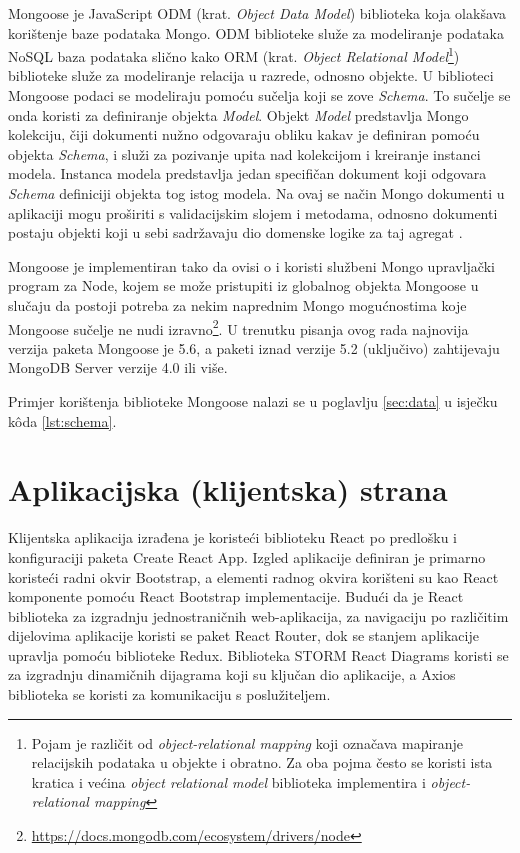 \documentclass[times, utf8, diplomski, numeric]{fer}
\begin{document}
Mongoose je JavaScript ODM (krat. \emph{Object Data Model}) biblioteka koja olakšava korištenje baze podataka Mongo.
ODM biblioteke služe za modeliranje podataka NoSQL baza podataka slično kako ORM (krat. \emph{Object Relational Model}\footnote{
    Pojam je različit od \emph{object-relational mapping} koji označava mapiranje relacijskih podataka u objekte i obratno. Za oba pojma često se koristi ista kratica i većina \emph{object relational model} biblioteka implementira i \emph{object-relational mapping}
}) biblioteke služe za modeliranje relacija u razrede, odnosno objekte. U biblioteci Mongoose podaci se modeliraju pomoću sučelja koji se zove \emph{Schema}.
To sučelje se onda koristi za definiranje objekta \emph{Model}.
Objekt \emph{Model} predstavlja Mongo kolekciju, čiji dokumenti nužno odgovaraju obliku kakav je definiran pomoću objekta \emph{Schema}, i služi za pozivanje upita nad kolekcijom i kreiranje instanci modela.
Instanca modela predstavlja jedan specifičan dokument koji odgovara \emph{Schema} definiciji objekta tog istog modela.
Na ovaj se način Mongo dokumenti u aplikaciji mogu proširiti s validacijskim slojem i metodama, odnosno dokumenti postaju objekti koji u sebi sadržavaju dio domenske logike za taj agregat \citep{mongoose}.

Mongoose je implementiran tako da ovisi o i koristi službeni Mongo upravljački program  za Node, kojem se može pristupiti iz globalnog objekta Mongoose u slučaju da postoji potreba za nekim naprednim Mongo mogućnostima koje Mongoose sučelje ne nudi izravno\footnote{\url{https://docs.mongodb.com/ecosystem/drivers/node}}.
U trenutku pisanja ovog rada najnovija verzija paketa Mongoose je 5.6, a paketi iznad verzije 5.2 (uključivo) zahtijevaju MongoDB Server verzije 4.0 ili više.

Primjer korištenja biblioteke Mongoose nalazi se u poglavlju \ref{sec:data} u isječku kôda \ref{lst:schema}.


\newpage
\section{Aplikacijska (klijentska) strana}

Klijentska aplikacija izrađena je koristeći biblioteku React po predlošku i konfiguraciji paketa Create React App.
Izgled aplikacije definiran je primarno koristeći radni okvir  Bootstrap, a elementi radnog okvira korišteni su kao React komponente pomoću React Bootstrap implementacije.
Budući da je React biblioteka za izgradnju jednostraničnih  web-aplikacija, za navigaciju po različitim dijelovima aplikacije koristi se paket React Router, dok se stanjem aplikacije upravlja pomoću biblioteke Redux.
Biblioteka STORM React Diagrams koristi se za izgradnju dinamičnih dijagrama koji su ključan dio aplikacije, a Axios biblioteka se koristi za komunikaciju s poslužiteljem.
\end{document}

